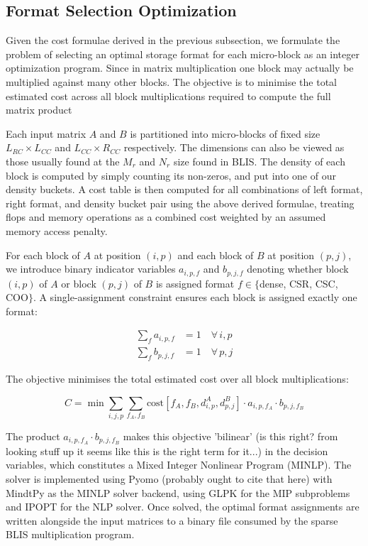 \documentclass[sigconf]{acmart}
\begin{document}
\subsection{Format Selection Optimization}

Given the cost formulae derived in the previous subsection, we formulate the problem of
selecting an optimal storage format for each micro-block as an integer optimization program.
Since in matrix multiplication one block may actually be multiplied against many other blocks.
The objective is to minimise the total estimated cost across all block multiplications
required to compute the full matrix product

Each input matrix $A$ and $B$ is partitioned into micro-blocks of fixed size
$L_{RC} \times L_{CC}$ and $L_{CC} \times R_{CC}$ respectively. The dimensions can also be viewed as those usually found at the $M_r$ and $N_r$ size found in BLIS. The density of each
block is computed by simply counting its non-zeros, and put into one of
our density buckets. A cost table is then computed for all combinations of left format,
right format, and density bucket pair using the above derived formulae, treating flops and
memory operations as a combined cost weighted by an assumed memory access penalty.

For each block of $A$ at position $(i, p)$ and each block of $B$ at position $(p, j)$,
we introduce binary indicator variables $a_{i,p,f}$ and $b_{p,j,f}$ denoting whether
block $(i,p)$ of $A$ or block $(p,j)$ of $B$ is assigned format $f \in \{$dense, CSR,
CSC, COO$\}$. A single-assignment constraint ensures each block is assigned exactly one
format:

\begin{align}
\sum_{f} a_{i,p,f} &= 1 \quad \forall\, i, p \\
\sum_{f} b_{p,j,f} &= 1 \quad \forall\, p, j
\end{align}

The objective minimises the total estimated cost over all block multiplications:

\begin{equation}
C = \min \sum_{i,j,p} \sum_{f_A, f_B}
    \text{cost}[f_A, f_B, d^A_{i,p}, d^B_{p,j}]
    \cdot a_{i,p,f_A} \cdot b_{p,j,f_B}
\end{equation}

The product $a_{i,p,f_A} \cdot b_{p,j,f_B}$ makes this objective 'bilinear' (is this right? from looking stuff up it seems like this is the right term for it...) in the
decision variables, which constitutes a Mixed Integer Nonlinear
Program (MINLP). The solver is implemented using Pyomo (probably ought to cite that here) with MindtPy as the MINLP solver backend, using GLPK for the MIP subproblems and IPOPT for the NLP
solver. Once solved, the optimal format assignments are written alongside the
input matrices to a binary file consumed by the sparse BLIS multiplication program.
\end{document}
